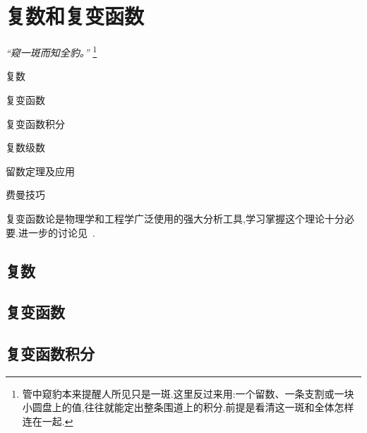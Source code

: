 


\chapter{复数和复变函数}

\begin{flushright}
\textit{“窥一斑而知全豹。”}
\footnote{管中窥豹本来提醒人所见只是一斑.这里反过来用:一个留数、一条支割或一块小圆盘上的值,往往就能定出整条围道上的积分.前提是看清这一斑和全体怎样连在一起.}
\end{flushright}

\begin{introduction}
\item 复数
\item 复变函数
\item 复变函数积分
\item 复数级数
\item 留数定理及应用
\item 费曼技巧
\end{introduction}

复变函数论是物理学和工程学广泛使用的强大分析工具,学习掌握这个理论十分必要.进一步的讨论见~\cite{churchill,ahlfors,needham,liang}.
\section{复数}

\section{复变函数}

\label{sec:complexfunctions}





\section{复变函数积分}



